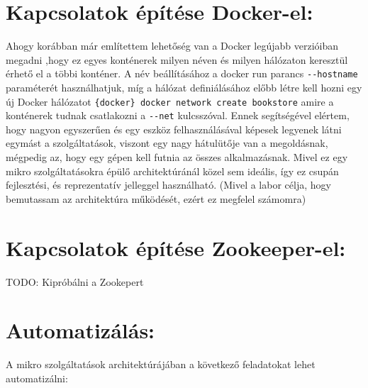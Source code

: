 \documentclass[11pt,magyar,a4paper,oneside,]{report}
\begin{document}
\section{Kapcsolatok építése
Docker-el:}\label{kapcsolatok-uxe9puxedtuxe9se-docker-el}

Ahogy korábban már említettem lehetőség van a Docker legújabb verzióiban
megadni ,hogy ez egyes konténerek milyen néven és milyen hálózaton
keresztül érhető el a többi konténer. A név beállításához a docker run
parancs \texttt{-{}-hostname} paraméterét használhatjuk, míg a hálózat
definiálásához előbb létre kell hozni egy új Docker hálózatot
\texttt{\{docker\}   docker network create bookstore} amire a konténerek
tudnak csatlakozni a \texttt{-{}-net} kulcsszóval. Ennek segítségével
elértem, hogy nagyon egyszerűen és egy eszköz felhasználásával képesek
legyenek látni egymást a szolgáltatások, viszont egy nagy hátulütője van
a megoldásnak, mégpedig az, hogy egy gépen kell futnia az összes
alkalmazásnak. Mivel ez egy mikro szolgáltatásokra épülő architektúránál
közel sem ideális, így ez csupán fejlesztési, és reprezentatív jelleggel
használható. (Mivel a labor célja, hogy bemutassam az architektúra
működését, ezért ez megfelel számomra)

\section{Kapcsolatok építése
Zookeeper-el:}\label{kapcsolatok-uxe9puxedtuxe9se-zookeeper-el}

TODO: Kipróbálni a Zookepert

\section{Automatizálás:}\label{automatizuxe1luxe1s}

A mikro szolgáltatások architektúrájában a következő feladatokat lehet
automatizálni:
\end{document}
